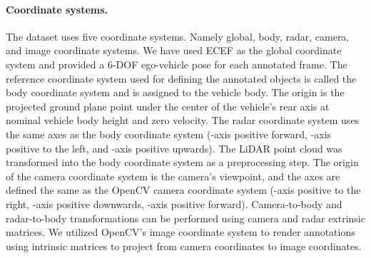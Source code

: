 \documentclass{article}
\begin{document}
\paragraph{Coordinate systems.} The dataset uses five coordinate systems. Namely global, body, radar, camera, and image coordinate systems. We have used ECEF \citep{snay1999modern} as the global coordinate system and provided a 6-DOF ego-vehicle pose for each annotated frame. The reference coordinate system used for defining the annotated objects is called the body coordinate system and is assigned to the vehicle body. The origin is the projected ground plane point under the center of the vehicle’s rear axis at nominal vehicle body height and zero velocity. The radar coordinate system uses the same axes as the body coordinate system (-axis positive forward, -axis positive to the left, and -axis positive upwards). The LiDAR point cloud was transformed into the body coordinate system as a preprocessing step. The origin of the camera coordinate system is the camera’s viewpoint, and the axes are defined the same as the OpenCV\citep{opencv} camera coordinate system (-axis positive to the right, -axis positive downwards, -axis positive forward). Camera-to-body and radar-to-body transformations can be performed using camera and radar extrinsic matrices. We utilized OpenCV's image coordinate system to render annotations using intrinsic matrices to project from camera coordinates to image coordinates.
\end{document}

